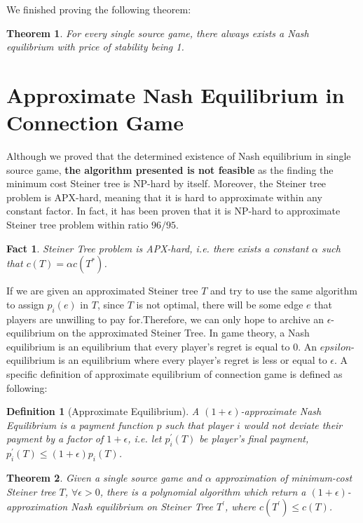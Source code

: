 \documentclass[11pt,psfig,times]{article}
\newtheorem{theorem}{Theorem}[section]
\newtheorem{definition}{Definition}[section]
\newtheorem{fact}{Fact}
\begin{document}
We finished proving the following theorem:
		\begin{theorem}
			For every single source game, there always exists a Nash equilibrium with price of stability being 1.
		\end{theorem}
	
\section{Approximate Nash Equilibrium in Connection Game}
	Although we proved that the determined existence of Nash equilibrium in single source game, \textbf{the algorithm presented is not feasible} as the finding the minimum cost Steiner tree is NP-hard by itself.  Moreover, the Steiner tree problem is APX-hard, meaning that it is hard to approximate within any constant factor. In fact, it has been proven that it is NP-hard to approximate Steiner tree problem within ratio \(96/95\). 
		
		\begin{fact}
			Steiner Tree problem is APX-hard, i.e. there exists a constant $\alpha$ such that $c(T) = \alpha c(T^*)$.
		\end{fact}
		
	If we are given an approximated Steiner tree \(T\) and try to use the same algorithm to assign \(p_i(e)\) in \(T\), since \(T\) is not optimal, there will be some edge \(e\) that players are unwilling to pay for.Therefore, we can only hope to archive an $\epsilon$-equilibrium on the approximated Steiner Tree. In game theory, a Nash equilibrium is an equilibrium that every player's regret is equal to 0. An $epsilon$-equilibrium is an equilibrium where every player's regret is less or equal to $\epsilon$. A specific definition of approximate equilibrium of connection game is defined as following:
		\begin{definition}[Approximate Equilibrium]
			A \((1+\epsilon)\)-approximate Nash Equilibrium is a payment function \(p\) such that player \(i\) would not deviate their payment by a factor of \(1+\epsilon\), i.e. let $ p_i^{'}(T)$ be player's final payment,$ p_i^{'}(T) \leq (1+\epsilon)p_i(T)$.
		\end{definition}
		
	
		\begin{theorem}
			Given a single source game and \(\alpha\) approximation of minimum-cost Steiner tree \(T\), \(\forall \epsilon > 0\), there is a polynomial algorithm which return a \((1+\epsilon)\)-approximation \textit{Nash equilibrium} on Steiner Tree \(T^{'}\), where $c(T^{'}) \leq c(T)$.
		\end{theorem}
	
\end{document}
